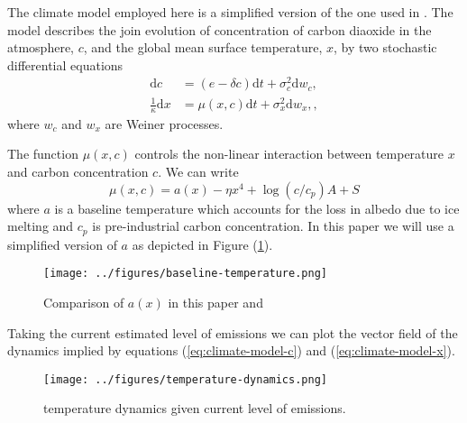 \documentclass[../../main.tex]{subfiles}
\begin{document}
The climate model employed here is a simplified version of the one used in \cite{mendez_investigating_2021}. The model describes the join evolution of concentration of carbon diaoxide in the atmosphere, $c$, and the global mean surface temperature, $x$, by two stochastic differential equations \begin{align}
    \text{d}c &= (e - \delta c) \text{d} t + \sigma^2_c \text{d} w_c, \label{eq:climate-model-c} \\
    \frac{1}{\kappa}\text{d}x &= \mu(x, c) \text{d} t + \sigma^2_x \text{d} w_x, \label{eq:climate-model-x},
\end{align} where $w_c$ and $w_x$ are Weiner processes.

The function $\mu(x, c)$ controls the non-linear interaction between temperature $x$ and carbon concentration $c$. We can write \begin{equation}
    \mu(x, c) = a(x) - \eta x^4 + \log(c / c_p) A + S
\end{equation} where $a$ is a baseline temperature which accounts for the loss in albedo due to ice melting and $c_p$ is pre-industrial carbon concentration. In this paper we will use a simplified version of $a$ as depicted in Figure (\ref{fig:baseline-temperature}).

\begin{figure}[H]
    \centering
    \texttt{[image: ../figures/baseline-temperature.png]}
    \caption{Comparison of $a(x)$ in this paper and \cite{mendez_investigating_2021}}
    \label{fig:baseline-temperature}
\end{figure}

Taking the current estimated level of emissions we can plot the vector field of the dynamics implied by equations (\ref{eq:climate-model-c}) and (\ref{eq:climate-model-x}).


\begin{figure}[H]
    \centering
    \texttt{[image: ../figures/temperature-dynamics.png]}
    \caption{temperature dynamics given current level of emissions.}
    \label{fig:temperature-dynamics}
\end{figure}
\end{document}
